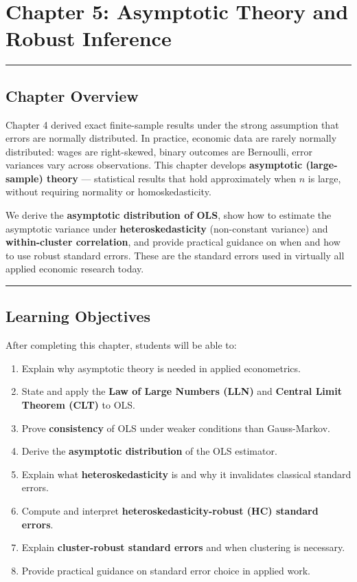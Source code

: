 \chapter{Chapter 5: Asymptotic Theory and Robust Inference}

\medskip\hrule\medskip

\section{Chapter Overview}

Chapter 4 derived exact finite-sample results under the strong assumption that errors are normally distributed. In practice, economic data are rarely normally distributed: wages are right-skewed, binary outcomes are Bernoulli, error variances vary across observations. This chapter develops \textbf{asymptotic (large-sample) theory} --- statistical results that hold approximately when $n$ is large, without requiring normality or homoskedasticity.

We derive the \textbf{asymptotic distribution of OLS}, show how to estimate the asymptotic variance under \textbf{heteroskedasticity} (non-constant variance) and \textbf{within-cluster correlation}, and provide practical guidance on when and how to use robust standard errors. These are the standard errors used in virtually all applied economic research today.

\medskip\hrule\medskip

\section{Learning Objectives}

After completing this chapter, students will be able to:

\begin{enumerate}
\item Explain why asymptotic theory is needed in applied econometrics.
\item State and apply the \textbf{Law of Large Numbers (LLN)} and \textbf{Central Limit Theorem (CLT)} to OLS.
\item Prove \textbf{consistency} of OLS under weaker conditions than Gauss-Markov.
\item Derive the \textbf{asymptotic distribution} of the OLS estimator.
\item Explain what \textbf{heteroskedasticity} is and why it invalidates classical standard errors.
\item Compute and interpret \textbf{heteroskedasticity-robust (HC) standard errors}.
\item Explain \textbf{cluster-robust standard errors} and when clustering is necessary.
\item Provide practical guidance on standard error choice in applied work.
\end{enumerate}

